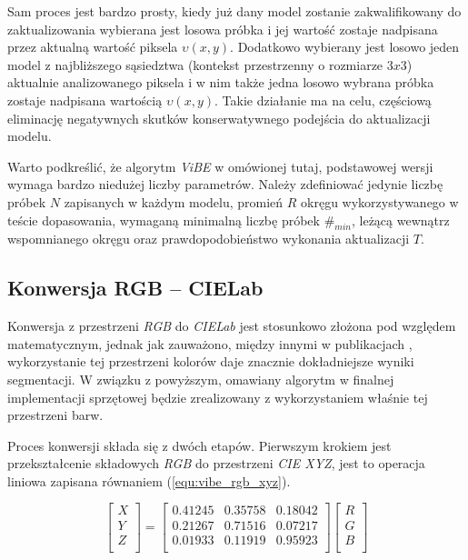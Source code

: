 Sam proces jest bardzo prosty, kiedy już dany model zostanie zakwalifikowany do zaktualizowania wybierana jest losowa próbka i jej wartość zostaje nadpisana przez aktualną wartość piksela $\upsilon(x,y)$. 
Dodatkowo wybierany jest losowo jeden model z najbliższego sąsiedztwa (kontekst przestrzenny o rozmiarze $3x3$) aktualnie analizowanego piksela i w nim także jedna losowo wybrana próbka zostaje nadpisana wartością $\upsilon(x,y)$. Takie działanie ma na celu, częściową eliminację negatywnych skutków konserwatywnego podejścia do aktualizacji modelu. 

Warto podkreślić, że algorytm \textit{ViBE} w omówionej tutaj, podstawowej wersji wymaga bardzo niedużej liczby parametrów. 
Należy zdefiniować jedynie liczbę próbek $N$ zapisanych w każdym modelu, promień $R$ okręgu wykorzystywanego w teście dopasowania, wymaganą minimalną liczbę próbek $\#_{min}$, leżącą wewnątrz wspomnianego okręgu oraz prawdopodobieństwo wykonania aktualizacji $T$.


\subsection{Konwersja RGB -- CIELab}
\label{subsec:vibe_cielab}

Konwersja z przestrzeni \textit{RGB} do \textit{CIELab} jest stosunkowo złożona pod względem matematycznym, jednak jak zauważono, między innymi w publikacjach \cite{kryjak_13_vibe, kryjak_14_vibe}, wykorzystanie tej przestrzeni kolorów daje znacznie dokładniejsze wyniki segmentacji. 
W związku z powyższym, omawiany algorytm w finalnej implementacji sprzętowej będzie zrealizowany z wykorzystaniem właśnie tej przestrzeni barw. 

Proces konwersji składa się z dwóch etapów. 
Pierwszym krokiem jest przekształcenie składowych \textit{RGB} do przestrzeni \textit{CIE XYZ}, jest to operacja liniowa zapisana równaniem (\ref{equ:vibe_rgb_xyz}).

	\begin{equation}
		\begin{bmatrix}
			X \\
			Y \\
			Z \\
		\end{bmatrix}
		=
		\begin{bmatrix}
			0.41245 & 0.35758 & 0.18042 \\
			0.21267 & 0.71516 & 0.07217 \\
			0.01933 & 0.11919 & 0.95923 \\
		\end{bmatrix}
		\begin{bmatrix}
			R \\
			G \\
			B \\
		\end{bmatrix}
	\label{equ:vibe_rgb_xyz}	
	\end{equation}	 

